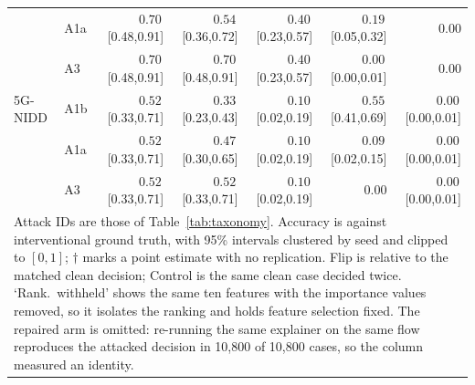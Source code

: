 \begin{tabular}{llrrrrr}
 & A1a & $0.70$\,[0.48,0.91] & $0.54$\,[0.36,0.72] & $0.40$\,[0.23,0.57] & $0.19$\,[0.05,0.32] & $0.00$\rlap{$^{\dagger}$} \\
 & A3 & $0.70$\,[0.48,0.91] & $0.70$\,[0.48,0.91] & $0.40$\,[0.23,0.57] & $0.00$\,[0.00,0.01] & $0.00$\rlap{$^{\dagger}$} \\
5G-NIDD & A1b & $0.52$\,[0.33,0.71] & $0.33$\,[0.23,0.43] & $0.10$\,[0.02,0.19] & $0.55$\,[0.41,0.69] & $0.00$\,[0.00,0.01] \\
 & A1a & $0.52$\,[0.33,0.71] & $0.47$\,[0.30,0.65] & $0.10$\,[0.02,0.19] & $0.09$\,[0.02,0.15] & $0.00$\,[0.00,0.01] \\
 & A3 & $0.52$\,[0.33,0.71] & $0.52$\,[0.33,0.71] & $0.10$\,[0.02,0.19] & $0.00$\rlap{$^{\dagger}$} & $0.00$\,[0.00,0.01] \\
\midrule
\multicolumn{7}{l}{\parbox{0.95\textwidth}{\footnotesize Attack IDs are those of Table~\ref{tab:taxonomy}. Accuracy is against interventional ground truth, with 95\% intervals clustered by seed and clipped to $[0,1]$; $\dagger$ marks a point estimate with no replication. Flip is relative to the matched clean decision; Control is the same clean case decided twice. `Rank.\ withheld' shows the same ten features with the importance values removed, so it isolates the ranking and holds feature selection fixed. The repaired arm is omitted: re-running the same explainer on the same flow reproduces the attacked decision in 10{,}800 of 10{,}800 cases, so the column measured an identity.}} \\
\bottomrule
\end{tabular}
